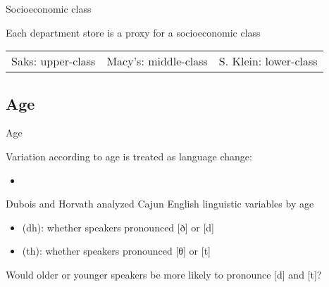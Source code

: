 \documentclass{beamer}
\newcommand{\subonetwo}{Socioeconomic class}
\newcommand{\subonethree}{Age}
\begin{document}
      \begin{frame}[t]{\subonetwo}
        \begin{block}{Each department store is a proxy for a socioeconomic class}
          {\small
            \begin{tabular}{l | l | l}
              Saks: upper-class & Macy's: middle-class & S. Klein: lower-class
            \end{tabular}
          }
        \end{block}
      \end{frame}

    \subsection{\subonethree}
      \begin{frame}{\subonethree}
        \begin{block}{}
          Variation according to age is treated as \alert{language change}:
          \begin{itemize}
            \item 
          \end{itemize}
        \end{block}
        \begin{block}{Dubois and Horvath analyzed Cajun English linguistic variables by age} %
          \begin{itemize}
            \item (dh): whether speakers pronounced [ð] or [d]
            \item (th): whether speakers pronounced [θ] or [t]
          \end{itemize}
        \end{block}
        \begin{block}{}
          Would older or younger speakers be more likely to pronounce [d] and [t]?
        \end{block}
      \end{frame}
\end{document}
